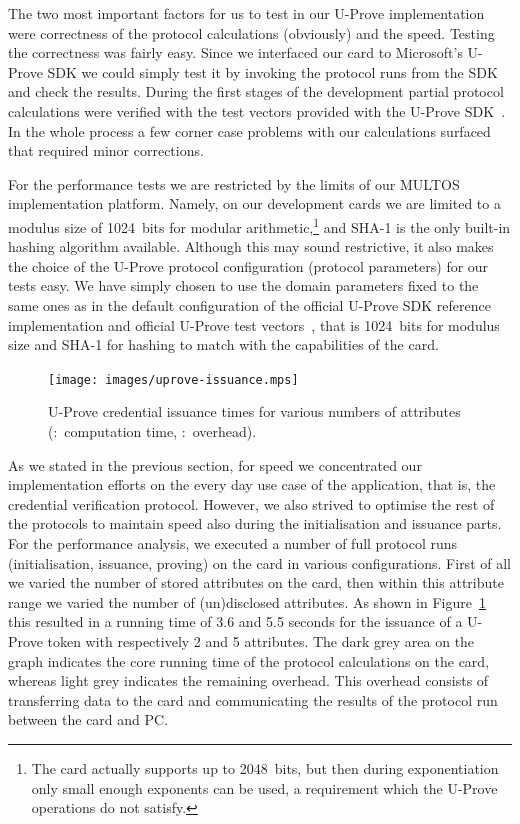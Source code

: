 The two most important factors for us to test in our U-Prove implementation were
correctness of the protocol calculations (obviously) and the speed. Testing the
correctness was fairly easy. Since we interfaced our card to Microsoft's U-Prove
SDK we could simply test it by invoking the protocol runs from the SDK and check
the results. During the first stages of the development partial protocol
calculations were verified with the test vectors provided with the U-Prove
SDK~\cite{U-Prove_Vectors2011}. In the whole process a few corner case problems
with our calculations surfaced that required minor corrections.

For the performance tests we are restricted by the limits of our MULTOS
implementation platform. Namely, on our development cards we are limited to a
modulus size of 1024~bits for modular arithmetic,\footnote{The card actually
supports up to 2048~bits, but then during exponentiation only small enough
exponents can be used, a requirement which the U-Prove operations do not
satisfy.} and SHA-1 is the only built-in hashing algorithm available. Although
this may sound restrictive, it also makes the choice of the U-Prove protocol
configuration (protocol parameters) for our tests easy. We have simply chosen to
use the domain parameters fixed to the same ones as in the default configuration
of the official U-Prove SDK reference implementation and official U-Prove test
vectors~\cite{U-Prove_Vectors2011}, that is 1024~bits for modulus size and SHA-1
for hashing to match with the capabilities of the card.

\begin{figure}
  \centering
  \texttt{[image: images/uprove-issuance.mps]}
  \caption[U-Prove credential issuance times for various numbers of attributes.]{
    U-Prove credential issuance times for various numbers of attributes
    (:~computation time,
      :~overhead).}
  \label{fig:issue}
\end{figure}

As we stated in the previous section, for speed we concentrated our
implementation efforts on the every day use case of the application, that is,
the credential verification protocol. However, we also strived to optimise the
rest of the protocols to maintain speed also during the initialisation and
issuance parts. For the performance analysis, we executed a number of full
protocol runs (initialisation, issuance, proving) on the card in various
configurations. First of all we varied the number of stored attributes on the
card, then within this attribute range we varied the number of (un)disclosed
attributes. As shown in Figure~\ref{fig:issue} this resulted in a running time
of 3.6 and 5.5 seconds for the issuance of a U-Prove token with respectively 2
and 5 attributes. The dark grey area on the graph indicates the core running
time of the protocol calculations on the card, whereas light grey indicates the
remaining overhead. This overhead consists of transferring data to the card and
communicating the results of the protocol run between the card and PC.

